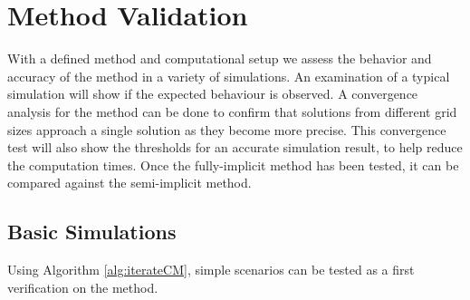 \section{Method Validation}

With a defined method and computational setup we assess the behavior and accuracy of the method in a variety of simulations.
An examination of a typical simulation will show if the expected behaviour is observed.
A convergence analysis for the method can be done to confirm that solutions from different grid sizes approach a single solution as they become more precise.
This convergence test will also show the thresholds for an accurate simulation result, to help reduce the computation times.
Once the fully-implicit method has been tested, it can be compared against the semi-implicit method.

\subsection{Basic Simulations}

Using Algorithm \ref{alg:iterateCM}, simple scenarios can be tested as a first verification on the method.

%
%



